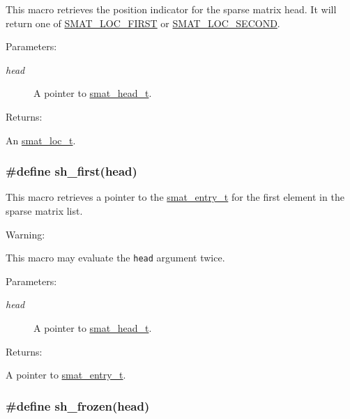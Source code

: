 This macro retrieves the position indicator for the sparse matrix head. It will return one of \hyperlink{group__dbprim__smat_a47a135}{SMAT\_\-LOC\_\-FIRST} or \hyperlink{group__dbprim__smat_a47a136}{SMAT\_\-LOC\_\-SECOND}.\begin{Desc}
\item[Parameters: ]\par
\begin{description}
\item[{\em 
head}]A pointer to \hyperlink{group__dbprim__smat_a1}{smat\_\-head\_\-t}.\end{description}
\end{Desc}
\begin{Desc}
\item[Returns: ]\par
An \hyperlink{group__dbprim__smat_a6}{smat\_\-loc\_\-t}. \end{Desc}
\hypertarget{group__dbprim__smat_a34}{
\subsubsection[sh\_\-first]{\setlength{\rightskip}{0pt plus 5cm}\#define sh\_\-first(head)}}
\label{group__dbprim__smat_a34}


This macro retrieves a pointer to the \hyperlink{group__dbprim__smat_a2}{smat\_\-entry\_\-t} for the first element in the sparse matrix list.

\begin{Desc}
\item[Warning: ]\par
This macro may evaluate the {\tt head} argument twice.\end{Desc}
\begin{Desc}
\item[Parameters: ]\par
\begin{description}
\item[{\em 
head}]A pointer to \hyperlink{group__dbprim__smat_a1}{smat\_\-head\_\-t}.\end{description}
\end{Desc}
\begin{Desc}
\item[Returns: ]\par
A pointer to \hyperlink{group__dbprim__smat_a2}{smat\_\-entry\_\-t}. \end{Desc}
\hypertarget{group__dbprim__smat_a32}{
\subsubsection[sh\_\-frozen]{\setlength{\rightskip}{0pt plus 5cm}\#define sh\_\-frozen(head)}}
\label{group__dbprim__smat_a32}


